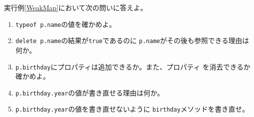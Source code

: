 \begin{Prob}\upshape
実行例\else\ref{WeakMap}\fi において次の問いに答えよ。
\begin{enumerate}
   \item \Must \texttt{typeof p.name}の値を確かめよ。\ifText\vspace{0.03\textheight}\fi
   \item \Must\texttt{delete p.name}の結果が\texttt{true}であるのに
         \texttt{p.name}がその後も参照できる理由は何か。\ifText\vspace{0.03\textheight}\fi
   \item \Must\texttt{p.birthday}にプロパティは追加できるか。また、プロパティ
         を消去できるか確かめよ。\ifText\vspace{0.05\textheight}\fi
   \item \Must\texttt{p.birthday.year}の値が書き直せる理由は何か。\ifText\vspace{0.03\textheight}\fi
   \item \texttt{p.birthday.year}の値を書き直せないように
         \texttt{birthday}メソッドを書き直せ。\ifText\vspace{0.07\textheight}\fi
\end{enumerate}
\end{Prob}
